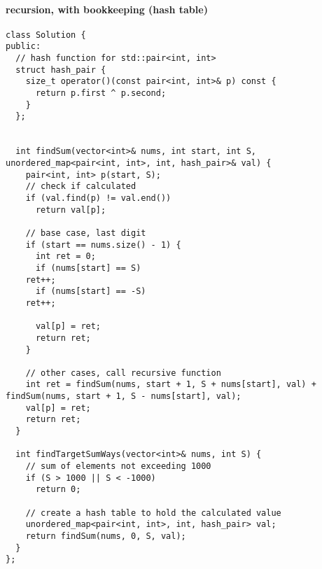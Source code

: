 \documentclass[11pt]{article}
\begin{document}
\paragraph{recursion, with bookkeeping (hash table)}
\label{sec:org2ce182d}
\begin{verbatim}
class Solution {
public:
  // hash function for std::pair<int, int>
  struct hash_pair {
    size_t operator()(const pair<int, int>& p) const {
      return p.first ^ p.second;
    }
  };


  int findSum(vector<int>& nums, int start, int S, unordered_map<pair<int, int>, int, hash_pair>& val) {
    pair<int, int> p(start, S);
    // check if calculated
    if (val.find(p) != val.end())
      return val[p];

    // base case, last digit 
    if (start == nums.size() - 1) {     
      int ret = 0;
      if (nums[start] == S)
	ret++;
      if (nums[start] == -S)
	ret++;

      val[p] = ret;
      return ret;
    }

    // other cases, call recursive function
    int ret = findSum(nums, start + 1, S + nums[start], val) + findSum(nums, start + 1, S - nums[start], val);
    val[p] = ret;
    return ret;
  }

  int findTargetSumWays(vector<int>& nums, int S) {
    // sum of elements not exceeding 1000
    if (S > 1000 || S < -1000)
      return 0;

    // create a hash table to hold the calculated value
    unordered_map<pair<int, int>, int, hash_pair> val;
    return findSum(nums, 0, S, val);
  }
};
\end{verbatim}
\end{document}
